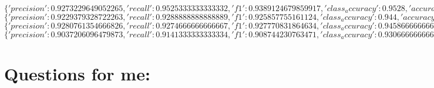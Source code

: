 $\{'precision': 0.9273229649052265, 'recall': 0.9525333333333332, 'f1': 0.9389124679859917, 'class_accuracy': 0.9528, 'accuracy': 0.9527999758720398\}$\\

$\{'precision': 0.9229379328722263, 'recall': 0.9288888888888889, 'f1': 0.925857755161124, 'class_accuracy': 0.944, 'accuracy': 0.9440000057220459\}$\\

$\{'precision': 0.9280761354666826, 'recall': 0.9274666666666667, 'f1': 0.927770831864634, 'class_accuracy': 0.9458666666666666, 'accuracy': 0.9458666443824768\}$\\

$\{'precision': 0.9037206096479873, 'recall': 0.9141333333333334, 'f1': 0.908744230763471, 'class_accuracy': 0.9306666666666666, 'accuracy': 0.9306666851043701\}$



\section{Questions for me:}

